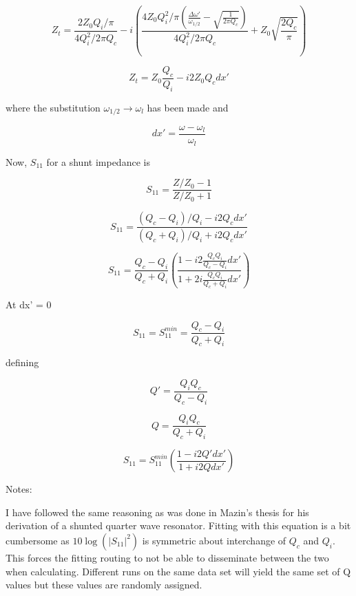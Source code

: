 \documentclass[12pt]{article}
\begin{document}
\[
Z_t = \frac{ 2Z_0 Q_i / \pi}{4Q_i^2 / 2\pi Q_c} - i \left( \frac{4 Z_0 Q_i^2/\pi \left( \frac{\Delta \omega'}{\omega_{1/2}} - \sqrt{\frac{1}{2 \pi Q_c}}\right)}{4Q_i^2/2\pi Q_c} + Z_0\sqrt{\frac{2Q_c}{\pi}} \right)
\]

\[
Z_t = Z_0 \frac{Q_c}{Q_i} - i 2 Z_0 Q_c dx'
\]

where the substitution $\omega_{1/2} \rightarrow \omega_l$ has been made and

\[
dx' = \frac{\omega - \omega_l}{\omega_l}
\]

Now, $S_{11}$ for a shunt impedance is

\[
S_{11} = \frac{Z/Z_0 -1}{Z/Z_0  + 1}
\]

\[
S_{11} = \frac{ (Q_c - Q_i)/Q_i - i 2 Q_c dx'}{ (Q_c + Q_i)/Q_i + i 2 Q_c dx'}
\]

\[
S_{11} = \frac{Q_c - Q_i}{Q_c + Q_i} \left( \frac{1 - i 2 \frac{Q_c Q_i}{Q_c - Q_i} dx'}{1 + 2 i \frac{Q_c Q_i}{Q_c + Q_i} dx' } \right)
\]

At dx' = 0

\[
S_{11} = S_{11}^{min} =  \frac{Q_c - Q_i}{Q_c + Q_i}
\]

defining

\[
Q' = \frac{Q_i Q_c}{Q_c - Q_i}
\]

\[
Q = \frac{Q_i Q_c}{Q_c + Q_i}
\]

\[
S_{11} = S_{11}^{min} \left( \frac{1 - i 2 Q' dx'}{1 + i 2 Q dx'} \right)
\]


Notes:

I have followed the same reasoning as was done in Mazin's thesis for his derivation of a shunted quarter wave resonator. Fitting with this equation is a bit cumbersome as $10 \log(|S_{11}|^2)$ is symmetric about interchange of $Q_c$ and $Q_i$. This forces the fitting routing to not be able to disseminate between the two when calculating. Different runs on the same data set will yield the same set of Q values but these values are randomly assigned.
\end{document}
